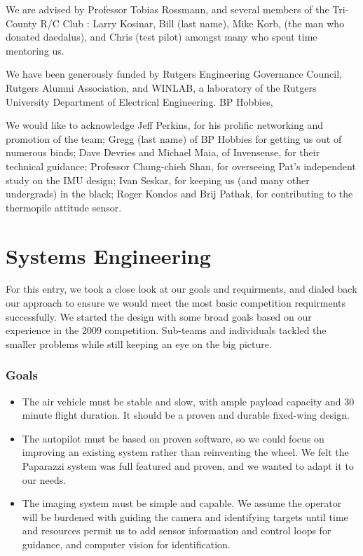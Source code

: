 \documentclass[10pt]{report}
\begin{document}
We are advised by
 Professor Tobias Rossmann,
 and several members of the Tri-County R/C Club \cite{tricountyRC}:
 Larry Kosinar,
 Bill (last name),
 Mike Korb,
 (the man who donated daedalus), and
 Chris (test pilot) amongst many who spent time mentoring us.

We have been generously funded by 
Rutgers Engineering Governance Council,
Rutgers Alumni Association, and
WINLAB, a laboratory of the Rutgers University Department of Electrical Engineering.
BP Hobbies, 

We would like to acknowledge
Jeff Perkins, for his prolific networking and promotion of the team;
Gregg (last name) of BP Hobbies for getting us out of numerous binds;
Dave Devries and Michael Maia, of Invensense, for their technical guidance;
Professor Chung-chieh Shan, for overseeing Pat's independent study on the IMU design;
Ivan Seskar, for keeping us (and many other undergrads) in the black;
Roger Kondos and Brij Pathak, for contributing to the thermopile attitude sensor.

\section{Systems Engineering}

For this entry, we took a close look at our goals and requirments, and dialed back our approach to ensure we would meet the most basic competition requirments successfully.
We started the design with some broad goals based on our experience in the 2009 competition. 
Sub-teams and individuals tackled the smaller problems while still keeping an eye on the big picture. 

\subsubsection{Goals}
\begin{itemize}
	\item The air vehicle must be stable and slow, with ample payload capacity and 30 minute flight duration. It should be a proven and durable fixed-wing design.
	\item The autopilot must be based on proven software, so we could focus on improving an existing system rather than reinventing the wheel. We felt the Paparazzi system was full featured and proven, and we wanted to adapt it to our needs.
	\item The imaging system must be simple and capable. We assume the operator will be burdened with guiding the camera and identifying targets until time and resources permit us to add sensor information and control loops for guidance, and computer vision for identification.
\end{itemize}
\end{document}

